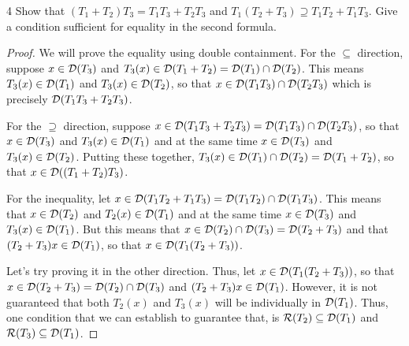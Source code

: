 \begin{exercise}{4}
Show that $(T_1 + T_2) T_3 = T_1 T_3 + T_2 T_3$ and $T_1 (T_2 + T_3) \supseteq T_1 T_2 + T_1 T_3$.
Give a condition sufficient for equality in the second formula.
\end{exercise}
\begin{proof}
We will prove the equality using double containment.
For the $\subseteq$ direction, suppose $x \in \mathcal{D}(T_3)$ and $T_3 (x) \in \mathcal{D}(T_1 + T_2) = \mathcal{D}(T_1) \cap \mathcal{D}(T_2)$.
This means $T_3 (x) \in \mathcal{D}(T_1)$ and $T_3 (x) \in \mathcal{D}(T_2)$, so that $x \in \mathcal{D}(T_1 T_3) \cap \mathcal{D}(T_2 T_3)$ which is precisely $\mathcal{D}(T_1 T_3 + T_2 T_3)$.

For the $\supseteq$ direction, suppose $x \in \mathcal{D}(T_1 T_3 + T_2 T_3) = \mathcal{D}(T_1 T_3) \cap \mathcal{D}(T_2 T_3)$, so that $x \in \mathcal{D}(T_3)$ and $T_3 (x) \in \mathcal{D}(T_1)$ and at the same time $x \in \mathcal{D}(T_3)$ and $T_3 (x) \in \mathcal{D}(T_2)$.
Putting these together, $T_3 (x) \in \mathcal{D}(T_1) \cap \mathcal{D}(T_2) = \mathcal{D}(T_1 + T_2)$, so that $x \in \mathcal{D}((T_1 + T_2) T_3)$.

For the inequality, let $x \in \mathcal{D}(T_1 T_2 + T_1 T_3) = \mathcal{D}(T_1 T_2) \cap \mathcal{D}(T_1 T_3)$.
This means that $x \in \mathcal{D}(T_2)$ and $T_2 (x) \in \mathcal{D}(T_1)$ and at the same time $x \in \mathcal{D}(T_3)$ and $T_3 (x) \in \mathcal{D}(T_1)$.
But this means that $x \in \mathcal{D}(T_2) \cap \mathcal{D}(T_3) = \mathcal{D}(T_2 + T_3)$ and that $(T_2 + T_3)x \in \mathcal{D}(T_1)$, so that $x \in \mathcal{D}(T_1 (T_2 + T_3))$.

Let's try proving it in the other direction.
Thus, let $x \in \mathcal{D}(T_1 (T_2 + T_3))$, so that $x \in \mathcal{D}(T_2 + T_3) = \mathcal{D}(T_2) \cap \mathcal{D}(T_3)$ and $(T_2 + T_3)x \in \mathcal{D}(T_1)$.
However, it is not guaranteed that both $T_2 (x)$ and $T_3 (x)$ will be individually in $\mathcal{D}(T_1)$.
Thus, one condition that we can establish to guarantee that, is $\mathcal{R}(T_2) \subseteq \mathcal{D}(T_1)$ and $\mathcal{R}(T_3) \subseteq \mathcal{D}(T_1)$.
\end{proof} 

